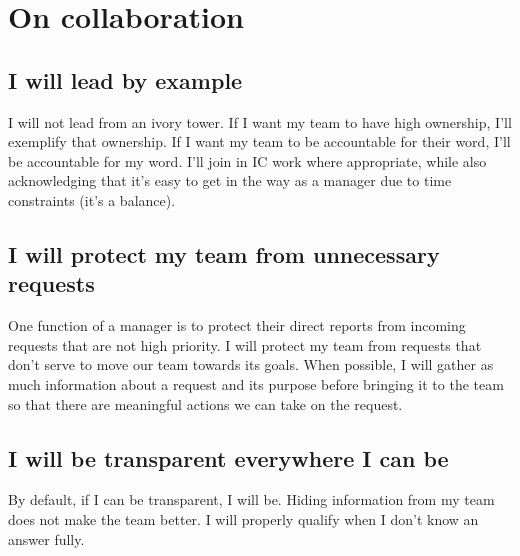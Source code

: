 \documentclass[11pt]{amsart}
\begin{document}

\section{On collaboration}

\subsection{I will lead by example}
I will not lead from an ivory tower. If I want my team to have high ownership, I'll exemplify that ownership. If I want my team to be accountable for their word, I'll be accountable for my word. I'll join in IC work where appropriate, while also acknowledging that it's easy to get in the way as a manager due to time constraints (it's a balance).

\subsection{I will protect my team from unnecessary requests}
One function of a manager is to protect their direct reports from incoming requests that are not high priority. I will protect my team from requests that don’t serve to move our team towards its goals. When possible, I will gather as much information about a request and its purpose before bringing it to the team so that there are meaningful actions we can take on the request.

\subsection{I will be transparent everywhere I can be}
By default, if I can be transparent, I will be. Hiding information from my team does not make the team better. I will properly qualify when I don’t know an answer fully.

\end{document}
